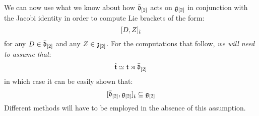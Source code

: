             \begin{remark} \label{remark: derivation_action_on_toroidal_centres}
                We can now use what we know about how $\bar{\mathfrak{d}}_{[2]}$ acts on $\mathfrak{g}_{[2]}$ in conjunction with the Jacobi identity in order to compute Lie brackets of the form:
                    $$[D, Z]_{\hat{\mathfrak{t}}}$$
                for any $D \in \bar{\mathfrak{d}}_{[2]}$ and any $Z \in \mathfrak{z}_{[2]}$. For the computations that follow, \textit{we will need to assume that}:
                    $$\hat{\mathfrak{t}} \simeq \mathfrak{t} \rtimes \bar{\mathfrak{d}}_{[2]}$$
                in which case it can be easily shown that:
                    $$[\bar{\mathfrak{d}}_{[2]}, \mathfrak{g}_{[2]}]_{\hat{\mathfrak{t}}} \subseteq \mathfrak{g}_{[2]}$$
                Different methods will have to be employed in the absence of this assumption.


\end{remark}
